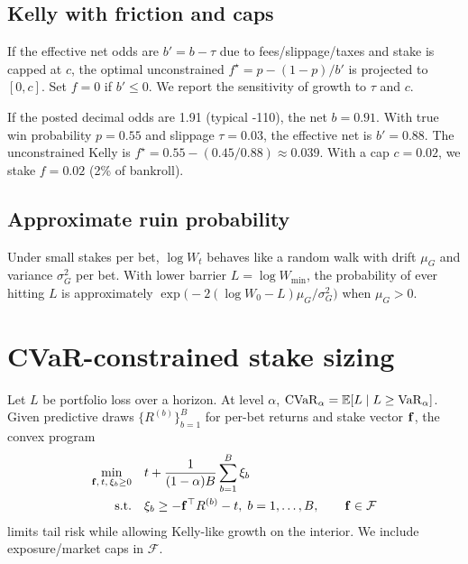 \subsection{Kelly with friction and caps}\label{subsec:kelly-friction}
If the effective net odds are $b' = b - \tau$ due to fees/slippage/taxes and stake is capped at $c$,
the optimal unconstrained $f^\star=p-(1-p)/b'$ is projected to $[0,c]$. Set $f=0$ if $b'\le 0$.
We report the sensitivity of growth to $\tau$ and $c$.

\begin{example}
If the posted decimal odds are 1.91 (typical -110), the net $b=0.91$. With true win probability $p=0.55$ and slippage $\tau=0.03$, the effective net is $b'=0.88$. The unconstrained Kelly is $f^\star=0.55-(0.45/0.88)\approx 0.039$. With a cap $c=0.02$, we stake $f=0.02$ (2\% of bankroll).
\end{example}

\subsection{Approximate ruin probability}\label{subsec:ruin}
Under small stakes per bet, $\log W_t$ behaves like a random walk with drift $\mu_G$ and variance
$\sigma_G^2$ per bet. With lower barrier $L=\log W_{\min}$, the probability of ever hitting $L$ is
approximately $\exp\!\big(-2(\log W_0-L)\mu_G/\sigma_G^2\big)$ when $\mu_G>0$.

\section{CVaR-constrained stake sizing}\label{sec:cvar-math}
Let $L$ be portfolio loss over a horizon. At level $\alpha$, $\mathrm{CVaR}_\alpha=\mathbb{E}[L\mid L\ge \mathrm{VaR}_\alpha]$.
Given predictive draws $\{R^{(b)}\}_{b=1}^B$ for per-bet returns and stake vector $\mathbf{f}$, the convex
program
\begin{align}
\min_{\mathbf{f},\,t,\,\xi_b\ge0}\quad & t+\frac{1}{(1-\alpha)B}\sum_{b=1}^B \xi_b \label{eq:cvar-prog}\\
\text{s.t.}\quad & \xi_b \ge -\mathbf{f}^\top R^{(b)} - t,\; b=1,\dots,B,\qquad \mathbf{f}\in\mathcal{F} \nonumber
\end{align}
limits tail risk while allowing Kelly-like growth on the interior. We include exposure/market caps in $\mathcal{F}$.


